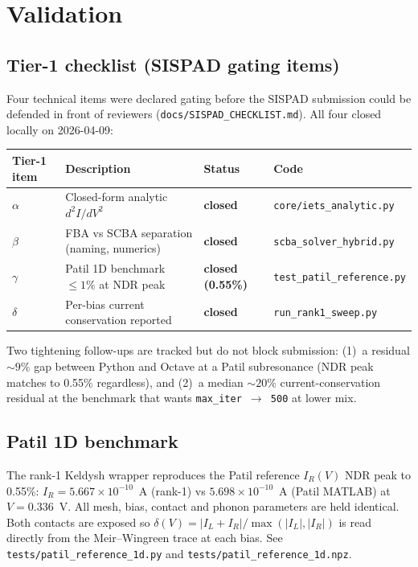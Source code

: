 \documentclass[11pt,a4paper,onecolumn]{article}
\newcommand{\code}[1]{\texttt{\small #1}}
\begin{document}
\section{Validation}
\label{sec:validation}

\subsection{Tier-1 checklist (SISPAD gating items)}
Four technical items were declared gating before the SISPAD submission
could be defended in front of reviewers
(\code{docs/SISPAD\_CHECKLIST.md}). All four closed locally on 2026-04-09:
\begin{center}
\small
\begin{tabular}{llll}
\toprule
Tier-1 item & Description & Status & Code\\
\midrule
$\alpha$ & Closed-form analytic $d^2I/dV^2$ & \textbf{closed} & \code{core/iets\_analytic.py}\\
$\beta$  & FBA vs SCBA separation (naming, numerics) & \textbf{closed} & \code{scba\_solver\_hybrid.py}\\
$\gamma$ & Patil 1D benchmark $\le 1\%$ at NDR peak & \textbf{closed (0.55\%)} & \code{test\_patil\_reference.py}\\
$\delta$ & Per-bias current conservation reported   & \textbf{closed} & \code{run\_rank1\_sweep.py}\\
\bottomrule
\end{tabular}
\end{center}
Two tightening follow-ups are tracked but do not block submission:
(1)~a residual $\sim 9\%$ gap between Python and Octave at a Patil
subresonance (NDR peak matches to 0.55\% regardless), and (2)~a median
$\sim\!20\%$ current-conservation residual at the benchmark that wants
\code{max\_iter $\to$ 500} at lower mix.

\subsection{Patil 1D benchmark}
The rank-1 Keldysh wrapper reproduces the Patil reference $I_R(V)$ NDR
peak to 0.55\%:
$I_R = 5.667 \times 10^{-10}$~A (rank-1) vs $5.698 \times 10^{-10}$~A
(Patil MATLAB) at $V = 0.336$~V. All mesh, bias, contact and phonon
parameters are held identical. Both contacts are exposed so
$\delta(V) = |I_L + I_R|/\max(|I_L|,|I_R|)$ is read directly from the
Meir--Wingreen trace at each bias. See
\code{tests/patil\_reference\_1d.py} and
\code{tests/patil\_reference\_1d.npz}.
\end{document}
